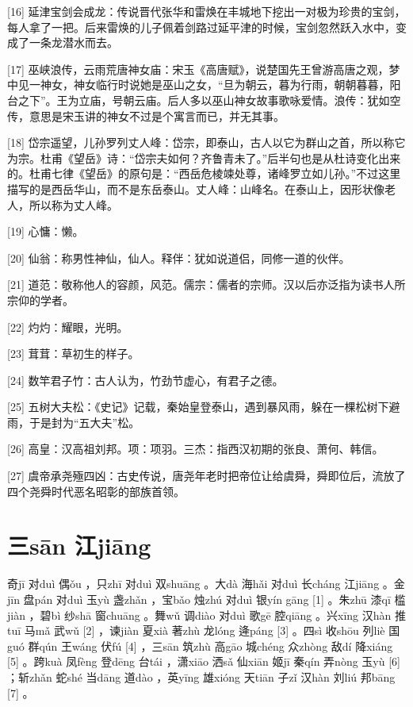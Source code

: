 \documentclass[12pt,UTF8]{ctexbook}
\begin{document}
[16] 延津宝剑会成龙：传说晋代张华和雷焕在丰城地下挖出一对极为珍贵的宝剑，每人拿了一把。后来雷焕的儿子佩着剑路过延平津的时候，宝剑忽然跃入水中，变成了一条龙潜水而去。

[17] 巫峡浪传，云雨荒唐神女庙：宋玉《高唐赋》，说楚国先王曾游高唐之观，梦中见一神女，神女临行时说她是巫山之女，“旦为朝云，暮为行雨，朝朝暮暮，阳台之下”。王为立庙，号朝云庙。后人多以巫山神女故事歌咏爱情。浪传：犹如空传，意思是宋玉讲的神女不过是个寓言而已，并无其事。

[18] 岱宗遥望，儿孙罗列丈人峰：岱宗，即泰山，古人以它为群山之首，所以称它为宗。杜甫《望岳》诗：“岱宗夫如何？齐鲁青未了。”后半句也是从杜诗变化出来的。杜甫七律《望岳》的原句是：“西岳危棱竦处尊，诸峰罗立如儿孙。”不过这里描写的是西岳华山，而不是东岳泰山。丈人峰：山峰名。在泰山上，因形状像老人，所以称为丈人峰。

[19] 心慵：懒。

[20] 仙翁：称男性神仙，仙人。释伴：犹如说道侣，同修一道的伙伴。

[21] 道范：敬称他人的容颜，风范。儒宗：儒者的宗师。汉以后亦泛指为读书人所宗仰的学者。

[22] 灼灼：耀眼，光明。

[23] 茸茸：草初生的样子。

[24] 数竿君子竹：古人认为，竹劲节虚心，有君子之德。

[25] 五树大夫松：《史记》记载，秦始皇登泰山，遇到暴风雨，躲在一棵松树下避雨，于是封为“五大夫”松。

[26] 高皇：汉高祖刘邦。项：项羽。三杰：指西汉初期的张良、萧何、韩信。

[27] 虞帝承尧殛四凶：古史传说，唐尧年老时把帝位让给虞舜，舜即位后，流放了四个尧舜时代恶名昭彰的部族首领。





\chapter{三sān 江jiāng}


奇jī 对duì 偶ǒu ，只zhī 对duì 双shuāng 。大dà 海hǎi 对duì 长cháng 江jiāng 。金jīn 盘pán 对duì 玉yù 盏zhǎn ，宝bǎo 烛zhú 对duì 银yín gāng [1] 。朱zhū 漆qī 槛jiàn ，碧bì 纱shā 窗chuāng 。舞wǔ 调diào 对duì 歌gē 腔qiāng 。兴xīng 汉hàn 推tuī 马mǎ 武wǔ [2] ，谏jiàn 夏xià 著zhù 龙lóng 逄páng [3] 。四sì 收shōu 列liè 国guó 群qún 王wáng 伏fú [4] ，三sān 筑zhù 高gāo 城chéng 众zhòng 敌dí 降xiáng [5] 。跨kuà 凤fèng 登dēng 台tái ，潇xiāo 洒sǎ 仙xiān 姬jī 秦qín 弄nòng 玉yù [6] ；斩zhǎn 蛇shé 当dāng 道dào ，英yīng 雄xióng 天tiān 子zǐ 汉hàn 刘liú 邦bāng [7] 。
\end{document}
